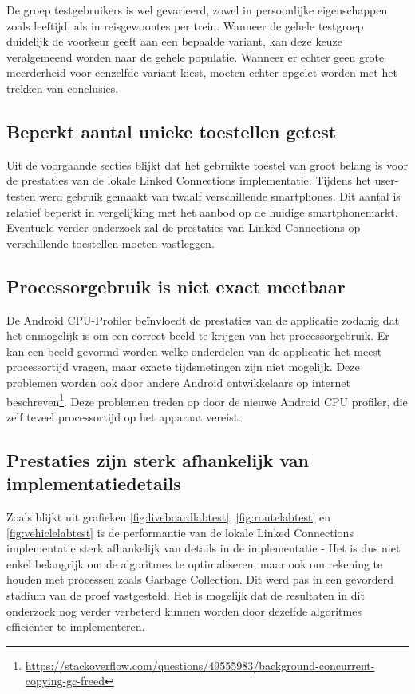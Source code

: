 De groep testgebruikers is wel gevarieerd, zowel in persoonlijke eigenschappen zoals leeftijd, als in reisgewoontes per trein. Wanneer de gehele testgroep duidelijk de voorkeur geeft aan een bepaalde variant, kan deze keuze veralgemeend worden naar de gehele populatie. Wanneer er echter geen grote meerderheid voor eenzelfde variant kiest, moeten echter opgelet worden met het trekken van conclusies.

\subsection{Beperkt aantal unieke toestellen getest}
Uit de voorgaande secties blijkt dat het gebruikte toestel van groot belang is voor de prestaties van de lokale Linked Connections implementatie. Tijdens het user-testen werd gebruik gemaakt van twaalf verschillende smartphones. Dit aantal is relatief beperkt in vergelijking met het aanbod op de huidige smartphonemarkt. Eventuele verder onderzoek zal de prestaties van Linked Connections op verschillende toestellen moeten vastleggen.

\subsection{Processorgebruik is niet exact meetbaar}
De Android CPU-Profiler beïnvloedt de prestaties van de applicatie zodanig dat het onmogelijk is om een correct beeld te krijgen van het processorgebruik. Er kan een beeld gevormd worden welke onderdelen van de applicatie het meest processortijd vragen, maar exacte tijdsmetingen zijn niet mogelijk. Deze problemen worden ook door andere Android ontwikkelaars op internet beschreven\footnote{\url{https://stackoverflow.com/questions/49555983/background-concurrent-copying-gc-freed}}. Deze problemen treden op door de nieuwe Android CPU profiler, die zelf teveel processortijd op het apparaat vereist.

\subsection{Prestaties zijn sterk afhankelijk van implementatiedetails}
Zoals blijkt uit grafieken \ref{fig:liveboardlabtest}, \ref{fig:routelabtest} en \ref{fig:vehiclelabtest} is de performantie van de lokale Linked Connections implementatie sterk afhankelijk van details in de implementatie - Het is dus niet enkel belangrijk om de algoritmes te optimaliseren, maar ook om rekening te houden met processen zoals Garbage Collection. Dit werd pas in een gevorderd stadium van de proef vastgesteld. Het is mogelijk dat de resultaten in dit onderzoek nog verder verbeterd kunnen worden door dezelfde algoritmes efficiënter te implementeren.

